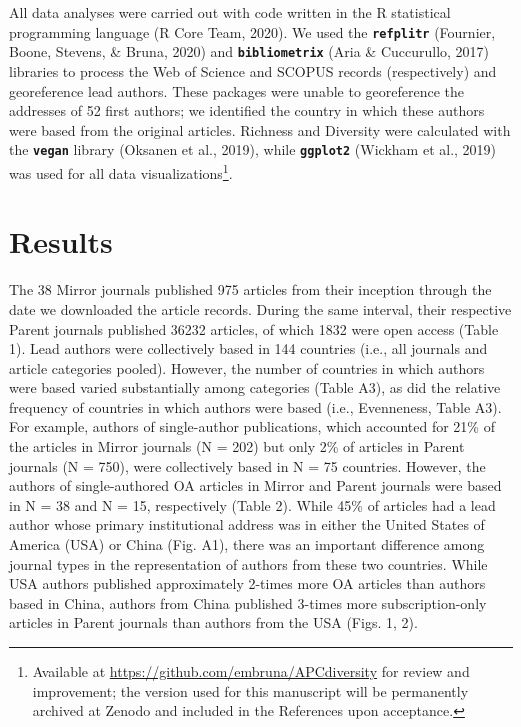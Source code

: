 \documentclass[
  english,
  man]{apa6}
\begin{document}
All data analyses were carried out with code written in the R statistical programming language (R Core Team, 2020). We used the \textbf{\texttt{refplitr}} (Fournier, Boone, Stevens, \& Bruna, 2020) and \textbf{\texttt{bibliometrix}} (Aria \& Cuccurullo, 2017) libraries to process the Web of Science and SCOPUS records (respectively) and georeference lead authors. These packages were unable to georeference the addresses of 52 first authors; we identified the country in which these authors were based from the original articles. Richness and Diversity were calculated with the \textbf{\texttt{vegan}} library (Oksanen et al., 2019), while \textbf{\texttt{ggplot2}} (Wickham et al., 2019) was used for all data visualizations\footnote{Available at \url{https://github.com/embruna/APCdiversity} for review and improvement; the version used for this manuscript will be permanently archived at Zenodo and included in the References upon acceptance.}.

\hypertarget{results}{%
\section{Results}\label{results}}

The 38 Mirror journals published 975 articles from their inception through the date we downloaded the article records. During the same interval, their respective Parent journals published 36232 articles, of which 1832 were open access (Table 1). Lead authors were collectively based in 144 countries (i.e., all journals and article categories pooled). However, the number of countries in which authors were based varied substantially among categories (Table A3), as did the relative frequency of countries in which authors were based (i.e., Evenneness, Table A3). For example, authors of single-author publications, which accounted for 21\% of the articles in Mirror journals (N = 202) but only 2\% of articles in Parent journals (N = 750), were collectively based in N = 75 countries. However, the authors of single-authored OA articles in Mirror and Parent journals were based in N = 38 and N = 15, respectively (Table 2). While 45\% of articles had a lead author whose primary institutional address was in either the United States of America (USA) or China (Fig. A1), there was an important difference among journal types in the representation of authors from these two countries. While USA authors published approximately 2-times more OA articles than authors based in China, authors from China published 3-times more subscription-only articles in Parent journals than authors from the USA (Figs. 1, 2).
\end{document}
